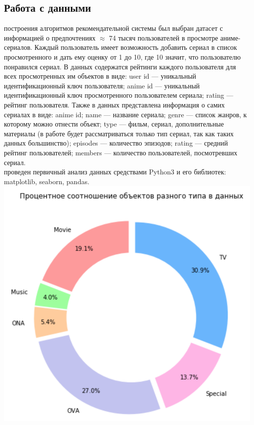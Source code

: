 \documentclass{article}
\newcommand\tab[1][1cm]{\hspace*{#1}}
\begin{document}
\subsection{Работа с данными}
 построения алгоритмов рекомендательной системы был выбран датасет с информацией о предпочтениях $\approx$ 74 тысяч пользователей в просмотре аниме-сериалов. Каждый пользователь имеет возможность добавить сериал в список просмотренного и дать ему оценку от 1 до 10, где 10 значит, что пользователю понравился сериал. В данных содержатся рейтинги каждого пользователя для всех просмотренных им объектов в виде: user id — уникальный идентификационный ключ пользователя; anime id — уникальный идентификационный ключ просмотренного пользователем сериала; rating — рейтинг пользователя. Также в данных представлена информация о самих сериалах в виде: anime id; name — название сериала; genre — список жанров, к которому можно отнести объект; type — фильм, сериал, дополнительные материалы (в работе будет рассматриваться только тип сериал, так как таких данных большинство); episodes — количество эпизодов; rating — средний рейтинг пользователей; members — количество пользователей, посмотревших сериал.\\
 проведен первичный анализ данных средствами Python3 и его библиотек: matplotlib, seaborn, pandas.\\
\tab\includegraphics[scale=0.8]{f3.png}\\
\end{document}
